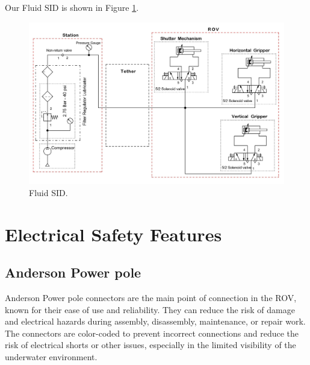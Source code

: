 \documentclass[11pt, twocolumn]{article}
\begin{document}
Our Fluid SID is shown in Figure \ref{fig:fluid_sid}.
\vspace{-0.3cm}
\begin{figure}[h!]
    \centering
    \includegraphics[width=\columnwidth]{Images/Pneumatic SID.jpg}
    \caption{Fluid SID.}
    \label{fig:fluid_sid}
\end{figure}

\vspace{-1cm}
\section{Electrical Safety Features}
\vspace{-0.3cm}
\subsection{Anderson Power pole}

Anderson Power pole connectors are the main point of connection in the ROV, known for their ease of use and reliability. They can reduce the risk of damage and electrical hazards during assembly, disassembly, maintenance, or repair work. The connectors are color-coded to prevent incorrect connections and reduce the risk of electrical shorts or other issues, especially in the limited visibility of the underwater environment.
\end{document}
